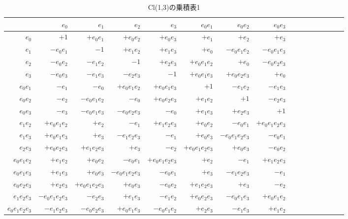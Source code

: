 \documentclass[a4paper,12pt,notitlepage]{jsreport}
\begin{document}
\begin{table}[ht]
  \begin{center}
    \caption{Cl(1,3)の乗積表1}
    \small
    \begin{tabular}{r|rrrrrrrrrrrrrrr}
      &$e_0$&$e_1$&$e_2$&$e_3$&$e_0e_1$&$e_0e_2$&$e_0e_3$\\\hline
      $e_0$&$+1$&$+e_0e_1$&$+e_0e_2$&$+e_0e_3$&$+e_1$&$+e_2$&$+e_3$\\
      $e_1$&$-e_0e_1$&$-1$&$+e_1e_2$&$+e_1e_3$&$+e_0$&$-e_0e_1e_2$&$-e_0e_1e_3$\\
      $e_2$&$-e_0e_2$&$-e_1e_2$&$-1$&$+e_2e_3$&$+e_0e_1e_2$&$+e_0$&$-e_0e_2e_3$\\
      $e_3$&$-e_0e_3$&$-e_1e_3$&$-e_2e_3$&$-1$&$+e_0e_1e_3$&$+e_0e_2e_3$&$+e_0$\\
      $e_0e_1$&$-e_1$&$-e_0$&$+e_0e_1e_2$&$+e_0e_1e_3$&$+1$&$-e_1e_2$&$-e_1e_3$\\
      $e_0e_2$&$-e_2$&$-e_0e_1e_2$&$-e_0$&$+e_0e_2e_3$&$+e_1e_2$&$+1$&$-e_2e_3$\\
      $e_0e_3$&$-e_3$&$-e_0e_1e_3$&$-e_0e_2e_3$&$-e_0$&$+e_1e_3$&$+e_2e_3$&$+1$\\
      $e_1e_2$&$+e_0e_1e_2$&$+e_2$&$-e_1$&$+e_1e_2e_3$&$+e_0e_2$&$-e_0e_1$&$+e_0e_1e_2e_3$\\
      $e_1e_3$&$+e_0e_1e_3$&$+e_3$&$-e_1e_2e_3$&$-e_1$&$+e_0e_3$&$-e_0e_1e_2e_3$&$-e_0e_1$\\
      $e_2e_3$&$+e_0e_2e_3$&$+e_1e_2e_3$&$+e_3$&$-e_2$&$+e_0e_1e_2e_3$&$+e_0e_3$&$-e_0e_2$\\
      $e_0e_1e_2$&$+e_1e_2$&$+e_0e_2$&$-e_0e_1$&$+e_0e_1e_2e_3$&$+e_2$&$-e_1$&$+e_1e_2e_3$\\
      $e_0e_1e_3$&$+e_1e_3$&$+e_0e_3$&$-e_0e_1e_2e_3$&$-e_0e_1$&$+e_3$&$-e_1e_2e_3$&$-e_1$\\
      $e_0e_2e_3$&$+e_2e_3$&$+e_0e_1e_2e_3$&$+e_0e_3$&$-e_0e_2$&$+e_1e_2e_3$&$+e_3$&$-e_2$\\
      $e_1e_2e_3$&$-e_0e_1e_2e_3$&$-e_2e_3$&$+e_1e_3$&$-e_1e_2$&$+e_0e_2e_3$&$-e_0e_1e_3$&$+e_0e_1e_2$\\
      $e_0e_1e_2e_3$&$-e_1e_2e_3$&$-e_0e_2e_3$&$+e_0e_1e_3$&$-e_0e_1e_2$&$+e_2e_3$&$-e_1e_3$&$+e_1e_2$\\
    \end{tabular}
  \end{center}
\end{table}
\end{document}
